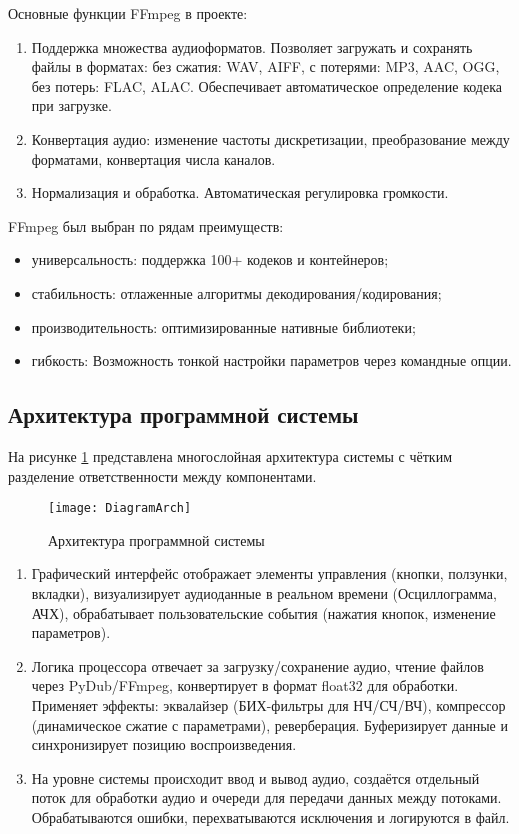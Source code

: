 Основные функции FFmpeg в проекте:
\begin{enumerate}
	\item Поддержка множества аудиоформатов. Позволяет загружать и сохранять файлы в форматах: без сжатия: WAV, AIFF, с потерями: MP3, AAC, OGG, без потерь: FLAC, ALAC. Обеспечивает автоматическое определение кодека при загрузке.
	\item Конвертация аудио: изменение частоты дискретизации, преобразование между форматами, конвертация числа каналов.
	\item Нормализация и обработка. Автоматическая регулировка громкости.
\end{enumerate}

FFmpeg был выбран по рядам преимуществ:
\begin{itemize}
	\item универсальность: поддержка 100+ кодеков и контейнеров;
	\item стабильность: отлаженные алгоритмы декодирования/кодирования;
	\item производительность: оптимизированные нативные библиотеки;
	\item гибкость: Возможность тонкой настройки параметров через командные опции.
\end{itemize}

\subsection{Архитектура программной системы}

На рисунке \ref{DiagramArch:image} представлена многослойная архитектура системы с чётким разделение ответственности между компонентами.

\begin{figure}[p]  %
	\centering
	\texttt{[image: DiagramArch]}
	\caption{Архитектура программной системы}
	\label{DiagramArch:image}
\end{figure}
\clearpage

\begin{enumerate}
	\item Графический интерфейс отображает элементы управления (кнопки, ползунки, вкладки), визуализирует аудиоданные в реальном времени (Осциллограмма, АЧХ), обрабатывает пользовательские события (нажатия кнопок, изменение параметров).
	\item Логика процессора отвечает за загрузку/сохранение аудио, чтение файлов через PyDub/FFmpeg, конвертирует в формат float32 для обработки. Применяет эффекты: эквалайзер (БИХ-фильтры для НЧ/СЧ/ВЧ), компрессор (динамическое сжатие с параметрами), реверберация. Буферизирует данные и синхронизирует позицию воспроизведения.
	\item На уровне системы происходит ввод и вывод аудио, создаётся отдельный поток для обработки аудио и очереди для передачи данных между потоками. Обрабатываются ошибки, перехватываются исключения и логируются в файл.
\end{enumerate}

